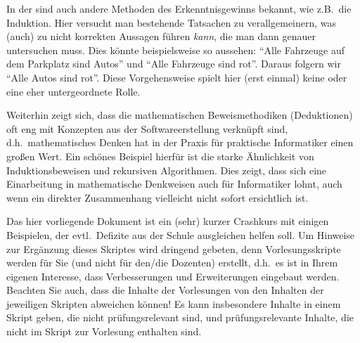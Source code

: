 In der  sind auch andere Methoden des
Erkenntnisgewinns bekannt, wie z.B.~die Induktion. Hier versucht man
bestehende Tatsachen zu verallgemeinern, was (auch) zu nicht korrekten
Aussagen führen \emph{kann}, die man dann genauer untersuchen
muss. Dies könnte beispielsweise so aussehen: "`Alle Fahrzeuge auf dem
Parkplatz sind Autos"' und "`Alle Fahrzeuge sind rot"'. Daraus folgern
wir "`Alle Autos sind rot"'. Diese Vorgehensweise spielt hier (erst
einmal) keine oder eine eher untergeordnete Rolle.

\bigskip

Weiterhin zeigt sich, dass die mathematischen Beweismethodiken
(Deduktionen) oft eng mit Konzepten aus der Softwareerstellung
verknüpft sind, d.h.~mathematisches Denken hat in der Praxis für
praktische Informatiker einen großen Wert. Ein schönes Beispiel
hierfür ist die starke Ähnlichkeit von Induktionsbeweisen und
rekursiven Algorithmen. Dies zeigt, dass sich eine Einarbeitung in
mathematische Denkweisen auch für Informatiker lohnt, auch wenn ein
direkter Zusammenhang vielleicht nicht sofort ersichtlich ist.

\bigskip

Das hier vorliegende Dokument ist ein (sehr) kurzer Crashkurs mit einigen
Beispielen, der evtl.~Defizite aus der Schule ausgleichen helfen
soll. Um Hinweise zur Ergänzung dieses Skriptes wird dringend gebeten,
denn Vorlesungsskripte werden für Sie (und nicht für den/die Dozenten)
erstellt, d.h.~es ist in Ihrem eigenen Interesse, dass Verbesserungen und
Erweiterungen eingebaut werden. Beachten Sie auch, dass die Inhalte
der Vorlesungen von den Inhalten der jeweiligen Skripten abweichen
können! Es kann insbesondere Inhalte in einem Skript geben, die nicht
prüfungsrelevant sind, und prüfungsrelevante Inhalte, die nicht im
Skript zur Vorlesung enthalten sind.

